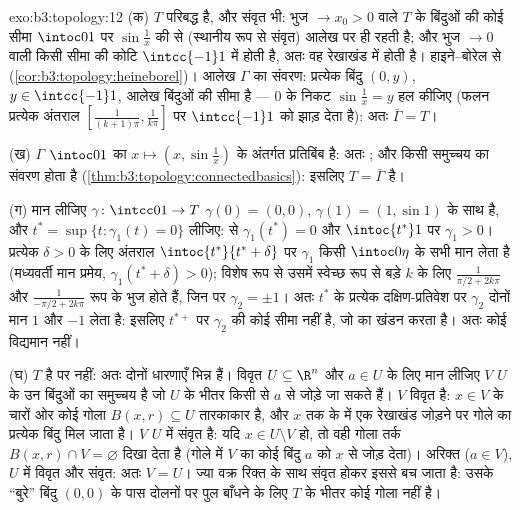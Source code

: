 \begin{solution}{exo:b3:topology:12}
(क) $T$ परिबद्ध है, और संवृत भी: भुज $\to x_0 > 0$ वाले $T$ के बिंदुओं
की कोई सीमा $\intoc01$ पर $\sin\frac1x$ की  से (स्थानीय रूप से संवृत)
आलेख पर ही रहती है; और भुज $\to 0$ वाली किसी सीमा की कोटि $\intcc{-1}1$ में
होती है, अतः वह रेखाखंड में होती है। हाइने--बोरेल से  (\cref{cor:b3:topology:heineborel})।
आलेख $\Gamma$ का संवरण: प्रत्येक बिंदु $(0, y)$, $y \in \intcc{-1}1$, आलेख बिंदुओं की
सीमा है --- $0$ के निकट $\sin\frac1x = y$ हल कीजिए (फलन प्रत्येक अंतराल $[\frac1{(k+1)\pi}, \frac1{k\pi}]$
पर $\intcc{-1}1$ को झाड़ देता है): अतः $\bar\Gamma = T$।

(ख) $\Gamma$  $\intoc01$ का $x \mapsto (x, \sin\frac1x)$ के अंतर्गत  प्रतिबिंब है: अतः
; और किसी  समुच्चय का संवरण  होता है (\cref{thm:b3:topology:connectedbasics}):
इसलिए $T = \bar\Gamma$  है।

(ग) मान लीजिए $\gamma\colon\intcc01\to T$ $\gamma(0) = (0,0)$, $\gamma(1) = (1, \sin1)$ के साथ  है, और $t^*
= \sup\{t : \gamma_1(t) = 0\}$ लीजिए:
 से $\gamma_1(t^*)
= 0$ और $\intoc{t^*}1$ पर $\gamma_1 > 0$। प्रत्येक $\delta > 0$ के लिए अंतराल
$\intoc{t^*}{t^*+\delta}$ पर $\gamma_1$ किसी $\intoc0\eta$ के सभी मान लेता है (मध्यवर्ती मान प्रमेय,
$\gamma_1(t^* + \delta) > 0$); विशेष रूप से उसमें स्वेच्छ रूप से बड़े $k$ के लिए $\frac1{\pi/2 + 2k\pi}$
और $\frac1{-\pi/2 + 2k\pi}$ रूप के भुज होते हैं, जिन पर $\gamma_2 = \pm1$। अतः $t^*$ के प्रत्येक
दक्षिण-प्रतिवेश पर $\gamma_2$ दोनों मान $1$ और $-1$ लेता है: इसलिए
$t^{*+}$ पर $\gamma_2$ की कोई सीमा नहीं है, जो  का खंडन करता है। अतः
कोई  विद्यमान नहीं।

(घ) $T$  है पर  नहीं: अतः दोनों धारणाएँ भिन्न हैं।
विवृत  $U \subseteq \R^n$ और $a \in U$ के लिए मान लीजिए $V$ $U$ के उन
बिंदुओं का समुच्चय है जो $U$ के भीतर किसी  से $a$ से जोड़े जा
सकते हैं। $V$ विवृत है: $x \in V$ के चारों ओर कोई गोला $B(x, r)
\subseteq U$ तारकाकार
है, और $x$ तक के  में एक रेखाखंड जोड़ने पर गोले का प्रत्येक बिंदु
मिल जाता है। $V$ $U$ में संवृत है: यदि $x \in U \setminus V$ हो, तो वही गोला
तर्क $B(x, r) \cap V = \varnothing$ दिखा देता है (गोले में $V$ का कोई बिंदु $a$ को $x$
से जोड़ देता)। अरिक्त ($a \in
V$),  $U$ में विवृत और संवृत: अतः
$V = U$। ज्या वक्र रिक्त  के साथ संवृत होकर इससे बच जाता है:
उसके ``बुरे'' बिंदु $(0,0)$ के पास दोलनों पर पुल बाँधने के लिए $T$
के भीतर कोई गोला नहीं है।
\end{solution}

